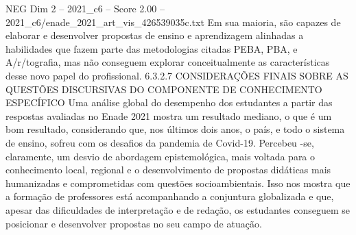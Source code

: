 \begin{textsample}{NEG Dim 2 – 2021\_c6 – Score 2.00 – 2021\_c6/enade\_2021\_art\_vis\_426539035c.txt}
Em sua maioria, são capazes de elaborar e desenvolver propostas de ensino e aprendizagem alinhadas a habilidades que fazem parte das metodologias citadas PEBA, PBA, e A/r/tografia, mas não conseguem explorar conceitualmente as características desse novo papel do profissional. 6.3.2.7 CONSIDERAÇÕES FINAIS SOBRE AS QUESTÕES DISCURSIVAS DO COMPONENTE DE CONHECIMENTO ESPECÍFICO Uma análise global do desempenho dos estudantes a partir das respostas avaliadas no Enade 2021 mostra um resultado mediano, o que é um bom resultado, considerando que, nos últimos dois anos, o país, e todo o sistema de ensino, sofreu com os desafios da pandemia de Covid-19.
Percebeu -se, claramente, um desvio de abordagem epistemológica, mais voltada para o conhecimento local, regional e o desenvolvimento de propostas didáticas mais humanizadas e comprometidas com questões socioambientais.
Isso nos mostra que a formação de professores está acompanhando a conjuntura globalizada e que, apesar das dificuldades de interpretação e de redação, os estudantes conseguem se posicionar e desenvolver propostas no seu campo de atuação.

\end{textsample}
